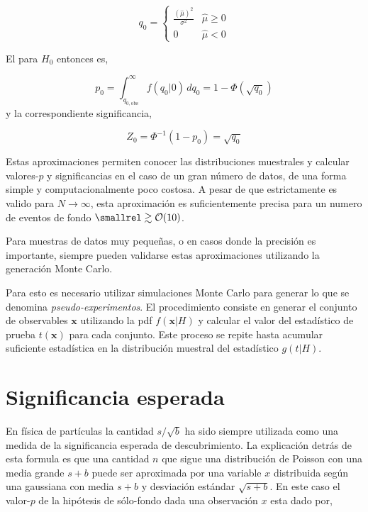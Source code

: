 \begin{equation}
  q_0 =
  \begin{cases}
    \frac{(\hat{\mu})^2}{\sigma^2} & \hat{\mu} \geq 0 \\
    0 & \hat{\mu} < 0
  \end{cases}
\end{equation}

El {\pvalue} para $H_0$ entonces es,

\begin{equation}
  p_0 = \int_{q_{0,\text{obs}}}^{\infty} f(q_0|0) \, dq_0 = 1 - \Phi(\sqrt{q_0})
\end{equation}
%
y la correspondiente significancia,

\begin{equation}
  Z_0 = \Phi^{-1} (1-p_0) = \sqrt{q_0}
\end{equation}

Estas aproximaciones permiten conocer las distribuciones muestrales y calcular
valores-$p$ y significancias en el caso de un gran número de datos, de una forma
simple y computacionalmente poco costosa. A pesar de que estrictamente es valido
para $N\to\infty$, esta aproximación es suficientemente precisa para un numero
de eventos de fondo $\smallrel\gtrsim \mathcal{O}(10)$.

Para muestras de datos muy pequeñas, o en casos donde la precisión es
importante, siempre pueden validarse estas aproximaciones utilizando la
generación Monte Carlo.

Para esto es necesario utilizar simulaciones Monte Carlo para generar lo que se
denomina \emph{pseudo-experimentos}. El procedimiento consiste en generar el
conjunto de observables $\bm{x}$ utilizando la pdf $f(\bm{x}|H)$ y calcular el
valor del estadístico de prueba $t(\bm{x})$ para cada conjunto. Este proceso se
repite hasta acumular suficiente estadística en la distribución muestral del
estadístico $g(t|H)$.



\section{Significancia esperada}

En física de partículas la cantidad $s/\sqrt{b}$ ha sido siempre utilizada como
una medida de la significancia esperada de descubrimiento\cite{medSigNote}. La
explicación detrás de esta formula es que una cantidad $n$ que sigue una
distribución de Poisson con una media grande $s+b$ puede ser aproximada por una
variable $x$ distribuida según una gaussiana con media $s+b$ y desviación
estándar $\sqrt{s+b}$. En este caso el valor-$p$ de la hipótesis de sólo-fondo
dada una observación $x$ esta dado por,

